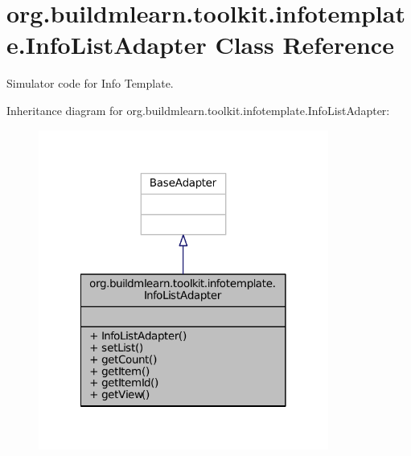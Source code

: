 \hypertarget{classorg_1_1buildmlearn_1_1toolkit_1_1infotemplate_1_1InfoListAdapter}{\section{org.\-buildmlearn.\-toolkit.\-infotemplate.\-Info\-List\-Adapter Class Reference}
\label{classorg_1_1buildmlearn_1_1toolkit_1_1infotemplate_1_1InfoListAdapter}
}


Simulator code for Info Template.  




Inheritance diagram for org.\-buildmlearn.\-toolkit.\-infotemplate.\-Info\-List\-Adapter\-:
\nopagebreak
\begin{figure}[H]
\begin{center}
\leavevmode
\includegraphics[width=270pt]{d4/d3d/classorg_1_1buildmlearn_1_1toolkit_1_1infotemplate_1_1InfoListAdapter__inherit__graph}
\end{center}
\end{figure}


